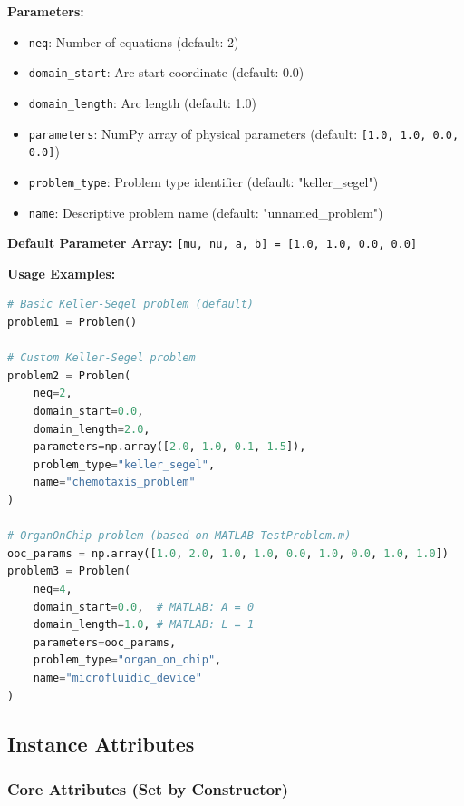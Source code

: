 \textbf{Parameters:}
\begin{itemize}
    \item \texttt{neq}: Number of equations (default: 2)
    \item \texttt{domain\_start}: Arc start coordinate (default: 0.0)
    \item \texttt{domain\_length}: Arc length (default: 1.0)
    \item \texttt{parameters}: NumPy array of physical parameters (default: \texttt{[1.0, 1.0, 0.0, 0.0]})
    \item \texttt{problem\_type}: Problem type identifier (default: "keller\_segel")
    \item \texttt{name}: Descriptive problem name (default: "unnamed\_problem")
\end{itemize}

\textbf{Default Parameter Array:} \texttt{[mu, nu, a, b] = [1.0, 1.0, 0.0, 0.0]}

\textbf{Usage Examples:}
\begin{lstlisting}[language=Python, caption=Constructor Usage Examples]
# Basic Keller-Segel problem (default)
problem1 = Problem()

# Custom Keller-Segel problem
problem2 = Problem(
    neq=2,
    domain_start=0.0,
    domain_length=2.0,
    parameters=np.array([2.0, 1.0, 0.1, 1.5]),
    problem_type="keller_segel",
    name="chemotaxis_problem"
)

# OrganOnChip problem (based on MATLAB TestProblem.m)
ooc_params = np.array([1.0, 2.0, 1.0, 1.0, 0.0, 1.0, 0.0, 1.0, 1.0])
problem3 = Problem(
    neq=4,
    domain_start=0.0,  # MATLAB: A = 0
    domain_length=1.0, # MATLAB: L = 1
    parameters=ooc_params,
    problem_type="organ_on_chip",
    name="microfluidic_device"
)
\end{lstlisting}

\subsection{Instance Attributes}
\label{subsec:instance_attributes}

\subsubsection{Core Attributes (Set by Constructor)}

